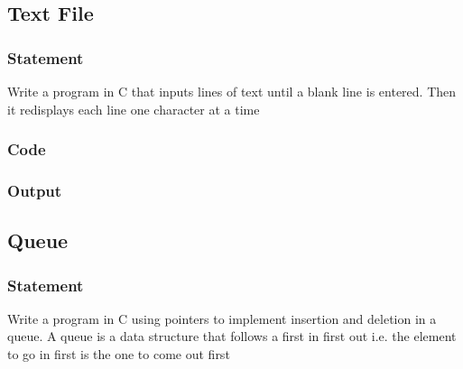 \pagebreak
\subsection{Text File}
\subsubsection{Statement}
Write a program in C that inputs lines of text until a blank line is entered. Then it redisplays
each line one character at a time
\subsubsection{Code}
\subsubsection{Output}

\pagebreak
\subsection{Queue}
\subsubsection{Statement}
Write a program in C using pointers to implement insertion and deletion in a queue. A queue
is a data structure that follows a first in first out i.e. the element to go in first is the one to come
out first
